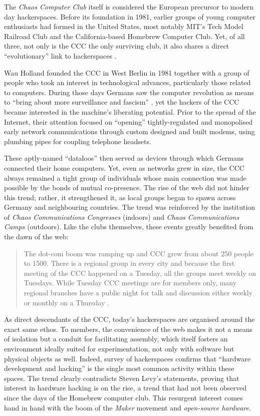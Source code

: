 The \textit{Chaos Computer Club} itself is considered the European precursor to modern day hackerspaces. Before its foundation in 1981, earlier groups of young computer enthusiasts had formed in the United States, most notably MIT's Tech Model Railroad Club and the California-based Homebrew Computer Club. Yet, of all three, not only is the CCC the only surviving club, it also shares a direct ``evolutionary'' link to hackerspaces \citep[p.84--86]{pettis11}.

Wau Holland founded the CCC in West Berlin in 1981 together with a group of people who took an interest in technological advances, particularly those related to computers. During those days Germans saw the computer revolution as means to ``bring about more surveillance and fascism'' \citep[p.84]{pettis11}, yet the hackers of the CCC became interested in the machine's liberating potential. Prior to the spread of the Internet, their attention focused on ``opening'' tightly-regulated and monopolised early network communications through custom designed and built modems, using plumbing pipes for coupling telephone headsets.

These aptly-named ``dataloos'' then served as devices through which Germans connected their home computers. Yet, even as networks grew in size, the CCC always remained a tight group of individuals whose main connection was made possible by the bonds of mutual co-presence. The rise of the web did not hinder this trend; rather, it strengthened it, as local groups began to spawn across Germany and neighbouring countries. The trend was reinforced by the institution of \textit{Chaos Communications Congresses} (indoors) and \textit{Chaos Communications Camps} (outdoors). Like the clubs themselves, these events greatly benefited from the dawn of the web:

\begin{quote}
The dot-com boom was ramping up and CCC grew from about 250 people to 1500. There is a regional group in every city and because the first meeting of the CCC happened on a Tuesday, all the groups meet weekly on Tuesdays. While Tuesday CCC meetings are for members only, many regional branches have a public night for talk and discussion either weekly or monthly on a Thursday \citep[p.84]{pettis11}.
\end{quote}

As direct descendants of the CCC, today's hackerspaces are organised around the exact same ethos. To members, the convenience of the web makes it not a means of isolation but a conduit for facilitating assembly, which itself fosters an environment ideally suited for experimentation, not only with software but physical objects as well. Indeed,  survey of hackerspaces confirms that ``hardware development and hacking'' is the single most common activity within these spaces. The trend clearly contradicts Steven Levy's statements, proving that interest in hardware hacking is on the rise, a trend that had not been observed since the days of the Homebrew computer club. This resurgent interest comes hand in hand with the boom of the \textit{Maker} movement and \textit{open-source hardware}.

